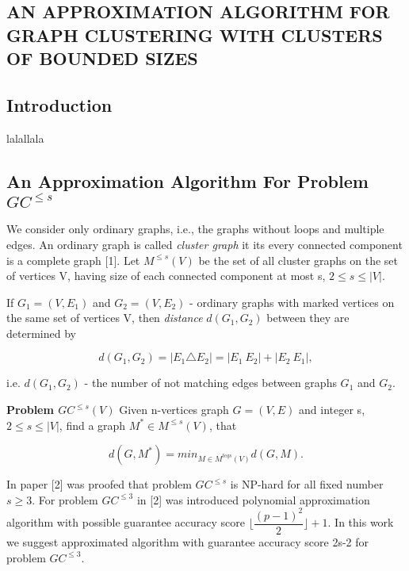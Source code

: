 \documentclass[12pt]{article}
\begin{document}
\begin{center}
	\section*{AN APPROXIMATION ALGORITHM FOR GRAPH CLUSTERING WITH CLUSTERS OF BOUNDED SIZES}
	\subsection*{Introduction}
\end{center}

lalallala

	\subsection*{An Approximation Algorithm For Problem $GC^{ \leq s} $}


We consider only ordinary graphs, i.e., the graphs without loops and multiple edges. An ordinary graph is called \textit{cluster graph} it its every connected component is a complete graph [1].
Let $M^{\leq s}(V)$ be the set of all cluster graphs on the set of vertices V, having size of each connected component at most s, $ 2 \leq s \leq |V|$.

If $G_1 = (V,E_1)$ and $G_2 = (V, E_2)$ - ordinary graphs with marked vertices on the same set of vertices V, then \textit{distance} $d(G_1,G_2)$ between they are determined by

$$
d(G_1,G_2) = |E_1\triangle E_2| = |E_1 \ E_2| + |E_2\ E_1|,
$$

i.e. $d(G_1,G_2)$ - the number of not matching edges between graphs $G_1$ and $G_2$.

\textbf{Problem $GC^{\leq s}(V)$} Given n-vertices  graph $G = (V,E)$ and integer s,  $2 \leq s \leq |V|$, find a graph $M^* \in M^{\leq s}(V)$, that

$$
d(G,M^*)= min_{M\in M^{leq s}(V)}d(G,M).
$$

In paper [2] was proofed that problem $GC^{\leq s}$ is NP-hard for all fixed number $s \geq 3$. For problem $GC^{\leq 3}$ in [2] was introduced polynomial approximation algorithm  with possible guarantee accuracy score
$ \lfloor \dfrac{(p-1)^2}{2} \rfloor + 1$. In this work we suggest approximated algorithm with guarantee accuracy score 2s-2 for problem $GC^{\leq 3}$. %
\end{document}
